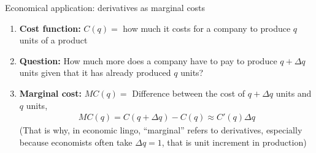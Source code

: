 \documentclass[9pt]{beamer}
\begin{document}

\begin{frame}{Economical application: derivatives as marginal costs}

    \begin{enumerate}[leftmargin = 0.5cm, label = , rightmargin = 0.2cm]

        \item \textbf{Cost function:} $C(q) = $ how much it costs for a company to produce $q$ units of a product

        \item \textbf{Question:} How much more does a company have to pay to produce $q + \Delta q$ units given that it has already produced $q$ units?
        
        \item \textbf{Marginal cost:} $MC(q) = $ Difference between the cost of $q + \Delta q$ units and $q$ units,
        \begin{align*}
            MC(q) = C(q + \Delta q) - C(q) \approx C'(q)\Delta q
        \end{align*}
        (That is why, in economic lingo, ``marginal'' refers to derivatives, especially because economists often take $\Delta q = 1$, that is unit increment in production)
        
    
    
    

    \end{enumerate}
    
\end{frame}
\end{document}
